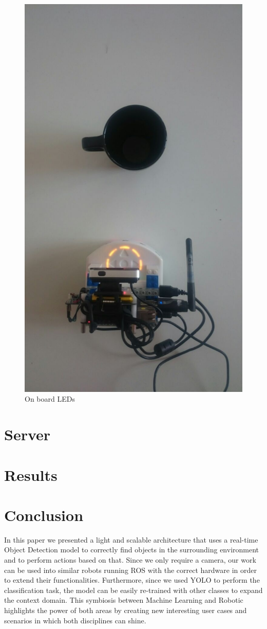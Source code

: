 \documentclass[letterpaper, 10 pt, conference]{ieeeconf}  %
\begin{document}
\begin{figure}[H]
\begin{center}
\includegraphics[width=0.25\linewidth]{images/leds/5}
\end{center}
\caption{On board LEDs}
\end{figure}

\section{Server}

\section{Results}

\section{Conclusion}
In this paper we presented a light and scalable architecture that uses a real-time Object Detection model to correctly find objects in the surrounding environment and to perform actions based on that. Since we only require a camera, our work can be used into similar robots running ROS with the correct hardware in order to extend their functionalities. Furthermore, since we used YOLO to perform the classification task, the model can be easily re-trained with other classes to expand the context domain. This symbiosis between Machine Learning and Robotic highlights the power of both areas by creating new interesting user cases and scenarios in which both disciplines can shine.

\printbibliography

%
\end{document}
